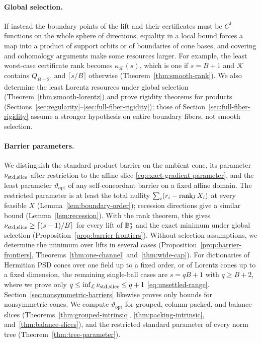 \paragraph{Global selection.}
If instead the boundary points of the lift and their certificates must
be $C^1$ functions on the whole sphere of directions, equality in a
local bound forces a map into a product of support orbits or of
boundaries of cone bases, and covering and cohomology arguments make
some resources larger. For example, the least worst-case certificate
rank becomes $\kappa_{\mathscr K}(s)$, which is one if $s=B+1$ and
$\mathscr K$ contains $Q_{B+2}$, and $\lceil s/B\rceil$ otherwise
(Theorem~\ref{thm:smooth-rank}). We also determine the least Lorentz
resources under global selection (Theorem~\ref{thm:smooth-lorentz}) and
prove rigidity theorems for products
(Sections~\ref{sec:regularity}--\ref{sec:full-fiber-rigidity}); those of
Section~\ref{sec:full-fiber-rigidity} assume a stronger hypothesis on
entire boundary fibers, not smooth selection.

\paragraph{Barrier parameters.}
We distinguish the standard product barrier on the ambient cone, its
parameter $\nu_{\mathrm{std},\mathrm{slice}}$ after restriction to the affine slice
\eqref{eq:exact-gradient-parameter}, and the least parameter
$\vartheta_{\mathrm{opt}}$ of any self-concordant barrier on a fixed
affine domain. The restricted parameter is at least the total nullity
$\sum_i(r_i-\operatorname{rank}_{\!J} X_i)$ at every feasible $X$
(Lemma~\ref{lem:boundary-order}); recession directions give a similar
bound (Lemma~\ref{lem:recession}). With the rank theorem, this gives
$\nu_{\mathrm{std},\mathrm{slice}}\geq\lceil(s-1)/B\rceil$ for every lift of $\mathbb B_2^s$ and the exact
minimum under global selection
(Proposition~\ref{prop:barrier-frontiers}). Without selection
assumptions, we determine the minimum over lifts in several cases
(Proposition~\ref{prop:barrier-frontiers},
Theorems~\ref{thm:one-channel} and~\ref{thm:wide-cap}). For dictionaries
of Hermitian PSD cones over one field up to a fixed order, or of Lorentz
cones up to a fixed dimension, the remaining single-ball cases are
$s=qB+1$ with $q\geq B+2$, where we prove only $q\leq\inf_{\mathcal
L}\nu_{\mathrm{std},\mathrm{slice}}\leq q+1$ \eqref{eq:unsettled-range}.
Section~\ref{sec:nonsymmetric-barriers} likewise proves only bounds for
nonsymmetric cones. We compute $\vartheta_{\mathrm{opt}}$ for grouped,
column-packed, and balance slices (Theorems~\ref{thm:grouped-intrinsic},
\ref{thm:packing-intrinsic}, and~\ref{thm:balance-slices}), and the
restricted standard parameter of every norm tree
(Theorem~\ref{thm:tree-parameter}).

